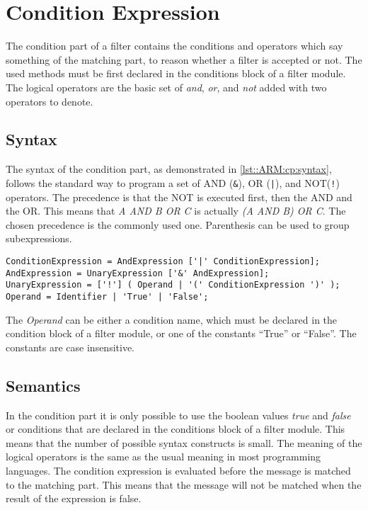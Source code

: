 \chapter{Condition Expression} \label{chapter:conditionpart}
The condition part of a filter contains the conditions and operators which say something of the matching part, to reason whether a filter is accepted or not. 
The used methods must be first declared in the conditions block of a filter module. 
The logical operators are the basic set of \emph{and}, \emph{or}, and \emph{not} added with two operators to denote.

\section{Syntax}
The syntax of the condition part, as demonstrated in \autoref{lst::ARM:cp:syntax}, follows the standard way to
program a set of AND (\lstinline|&|), OR (\lstinline$|$), and NOT(\lstinline|!|) operators. 
The precedence is that the NOT is executed first, then the AND and the OR.
This means that \emph{A AND B OR C} is actually \emph{(A AND B) OR C}. 
The chosen precedence is the commonly used one.
Parenthesis can be used to group subexpressions.

\begin{lstlisting}[caption={Filter condition part syntax},label=lst::ARM:cp:syntax,style=listing,language=ebnf,float=tpb]
ConditionExpression = AndExpression ['|' ConditionExpression];
AndExpression = UnaryExpression ['&' AndExpression];
UnaryExpression = ['!'] ( Operand | '(' ConditionExpression ')' );
Operand = Identifier | 'True' | 'False';
\end{lstlisting}

The \emph{Operand} can be either a condition name, which must be declared in the condition block of a filter module, or one of the constants ``True'' or ``False''. 
The constants are case insensitive.

\section{Semantics}
In the condition part it is only possible to use the boolean values \emph{true} and \emph{false} or conditions that are declared in the conditions block of a filter module.
This means that the number of possible syntax constructs is small.
The meaning of the logical operators is the same as the usual meaning in most programming languages.
The condition expression is evaluated before the message is matched to the matching part.
This means that the message will not be matched when the result of the expression is false. 

